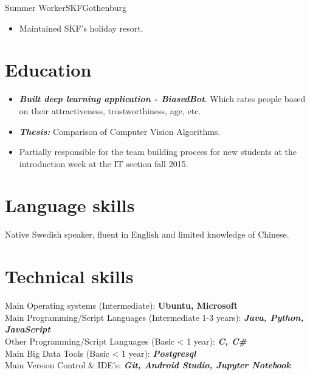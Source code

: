 \documentclass[11pt,a4paper,sans,colorlinks,linkcolor=blue,urlcolor=blue]{moderncv}
\begin{document}
{Summer Worker}{SKF}{Gothenburg}{}
{\begin{itemize}
    \itemsep0.3em
    \setlength{\itemindent}{.25in}
    \item Maintained SKF's holiday resort.
\end{itemize}}

\section{Education}

{\begin{itemize}
    \setlength{\itemindent}{.25in}
    \itemsep0.3em
    \item \textit{\textbf{Built deep learning application - BiasedBot}}. Which rates people based on their attractiveness, trustworthiness, age, etc.
\end{itemize}}{}


{\begin{itemize}
    \setlength{\itemindent}{.25in}
    \itemsep0.3em
    \item \textit{\textbf{Thesis:}} Comparison of Computer Vision Algorithms.
    \item Partially responsible for the team building process for new students at the introduction week at the IT section fall 2015.
\end{itemize}}{}

\section{Language skills}
Native Swedish speaker, fluent in English and limited knowledge of Chinese.
\section{Technical skills}
Main Operating systems (Intermediate): \textbf{Ubuntu, Microsoft}
\\
{Main Programming/Script Languages (Intermediate 1-3 years): \textbf{\textit{Java, Python, JavaScript}}}
\\
{Other Programming/Script Languages (Basic < 1 year): \textbf{\textit{C, C\#}}}
\\
Main Big Data Tools (Basic < 1 year): 
\textbf{\textit{Postgresql}}
\\
Main Version Control \& IDE's: \textbf{\textit{Git, Android Studio, Jupyter Notebook}}
\\
\\
\end{document}
